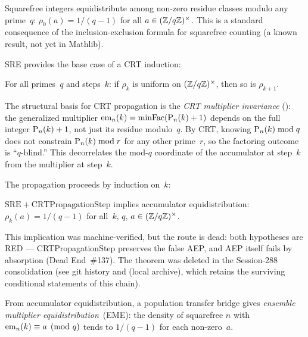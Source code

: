 \begin{remark}
Squarefree integers equidistribute among non-zero residue classes
modulo any prime~$q$: $\rho_0(a) = 1/(q{-}1)$ for all
$a \in (\mathbb{Z}/q\mathbb{Z})^\times$.
This is a standard consequence of the inclusion-exclusion formula for
squarefree counting (a known result, not yet in Mathlib).
\end{remark}

SRE provides the base case of a CRT induction:

\begin{property}
For all primes~$q$ and steps~$k$: if $\rho_k$ is uniform on
$(\mathbb{Z}/q\mathbb{Z})^\times$, then so is $\rho_{k+1}$.
\end{property}

The structural basis for CRT propagation is the \emph{CRT multiplier
invariance}
(): the generalized
multiplier $\mathrm{em}_{n}(k) = \mathrm{minFac}(\mathrm{P}_{n}(k) + 1)$
depends on the full integer $\mathrm{P}_{n}(k) + 1$, not just its residue
modulo~$q$.  By CRT, knowing $\mathrm{P}_{n}(k) \bmod q$ does not
constrain $\mathrm{P}_{n}(k) \bmod r$ for any other prime~$r$, so the
factoring outcome is ``$q$-blind.''  This decorrelates the mod-$q$
coordinate of the accumulator at step~$k$ from the multiplier at
step~$k$.

The propagation proceeds by induction on~$k$:

\begin{theorem}
\label{thm:sre-crt}
$\mathrm{SRE} + \mathrm{CRTPropagationStep}$ implies
accumulator equidistribution:
$\rho_k(a) = 1/(q{-}1)$ for all~$k$, $q$,
$a \in (\mathbb{Z}/q\mathbb{Z})^\times$.
\end{theorem}

\noindent This implication was machine-verified, but the route is dead:
both hypotheses are RED --- CRTPropagationStep preserves the false AEP,
and AEP itself fails by absorption (Dead End~\#137).  The theorem was
deleted in the Session-288 consolidation (see git history and
 (local archive), which retains the
surviving conditional statements of this chain).

From accumulator equidistribution, a population transfer bridge gives
\emph{ensemble multiplier equidistribution}~(EME): the density of
squarefree $n$ with $\mathrm{em}_{n}(k) \equiv a \pmod{q}$ tends
to $1/(q{-}1)$ for each non-zero~$a$.

